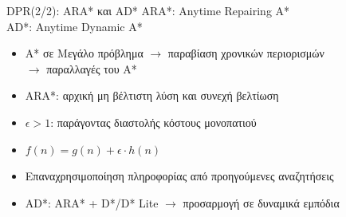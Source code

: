 \documentclass[10pt, compress, handout]{beamer} %
\begin{document}
\begin{frame}{DPR(2/2): ARA* και AD*}
	ARA*: Anytime Repairing A*\\
	AD*: Anytime Dynamic A*
	
	\begin{itemize}
		\item A* σε Μεγάλο πρόβλημα $\rightarrow$ παραβίαση χρονικών περιορισμών\\$\rightarrow$  παραλλαγές του A*
		\item ARA*: αρχική μη βέλτιστη λύση και συνεχή βελτίωση
		\item $\epsilon>1$: παράγοντας διαστολής κόστους μονοπατιού
		\item $f(n) = g(n) + \epsilon \cdot h(n)$
		\item Επαναχρησιμοποίηση πληροφορίας από προηγούμενες αναζητήσεις
		\item AD*: ARA* + D*/D* Lite $\rightarrow$ προσαρμογή σε δυναμικά εμπόδια
	\end{itemize}
	\begin{figure}
		\captionsetup[subfigure]{labelformat=empty}
		\hspace{0.5cm}
	\end{figure}
\end{frame}
\end{document}
